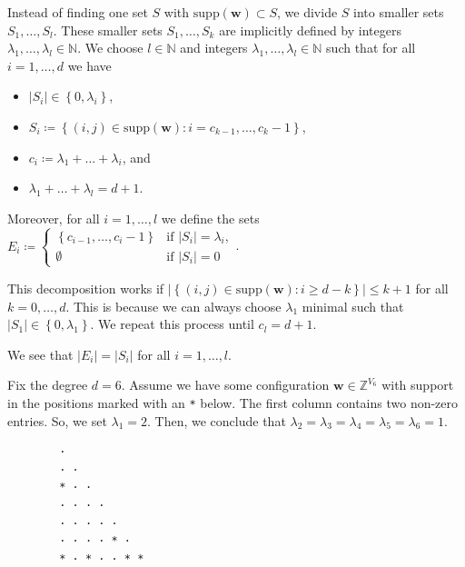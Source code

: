 Instead of finding one set \( S \) with \( \mathrm{supp}(\mathbf w) \subset S \), we divide \( S \) into smaller sets \( S_1, \dots, S_l \). These smaller sets \( S_1, \dots, S_k \) are implicitly defined by integers \( \lambda_1, \dots, \lambda_l \in \mathbb{N} \). We choose \( l \in \mathbb{N} \) and integers \( \lambda_1, \dots, \lambda_l \in \mathbb{N} \) such that for all \( i=1, \dots, d \) we have 
\begin{itemize}
    \item \( \lvert S_i \rvert \in \left\{ 0, \lambda_i \right\} \), 
    \item \( S_i \coloneqq \left\{ (i,j) \in \mathrm{supp}(\mathbf w) : i = c_{k-1}, \dots, c_k - 1 \right\} \),
    \item  \( c_i \coloneqq \lambda_1 + \dots + \lambda_i\), and
    \item \(  \lambda_1 + \dots + \lambda_l = d+1 \).
\end{itemize}
Moreover, for all \( i=1, \dots, l \) we define the sets \( E_i \coloneqq \begin{cases}
    \left\{ c_{i-1}, \dots, c_i - 1 \right\} & \text{if } \lvert S_i \rvert = \lambda_i, \\
    \emptyset & \text{if } \lvert S_i \rvert = 0
\end{cases} \).

\begin{remark}\label{rem:ksldmfiewonowiniew}
This decomposition works if \( \lvert \left\{ (i,j) \in \mathrm{supp}(\mathbf{w}) : i \geq d-k \right\} \rvert \leq k+1 \) for all \( k = 0, \dots, d \). This is because we can always choose \( \lambda_1  \) minimal such that \( \lvert S_1 \rvert \in \left\{ 0, \lambda_1 \right\} \). We repeat this process until \( c_l = d+1 \). 
\end{remark}

\begin{remark}
    We see that \( \lvert E_i \rvert = \lvert S_i \rvert \) for all \( i = 1, \dots, l \). 
\end{remark}

\begin{example}\label{ex:decomposition-nsjkfnje}
    Fix the degree \( d=6 \). Assume we have some configuration \( \mathbf w \in \mathbb{Z}^{V_6} \) with support in the positions marked with an \texttt{*} below. The first column contains two non-zero entries. So, we set \( \lambda_1 = 2 \). Then, we conclude that \( \lambda_2 = \lambda_3 = \lambda_4 = \lambda_5 = \lambda_6 = 1\).
    \begin{verbatim}
        · 
        · · 
        * · · 
        · · · · 
        · · · · · 
        · · · · * · 
        * · * · · * *
    \end{verbatim}
\end{example}

